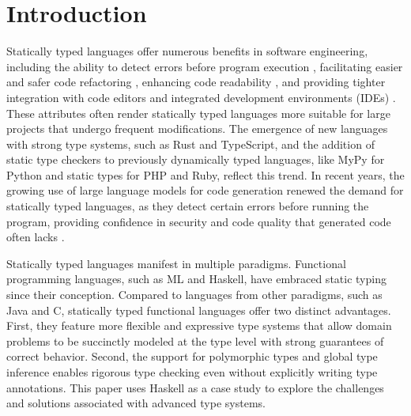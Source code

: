 \documentclass[pdflatex,lineno,sn-nature,Numbered]{sn-jnl}%
\begin{document}
\maketitle

\section{Introduction} \label{sec:introduction}

Statically typed languages offer numerous benefits in software engineering, including the ability to detect errors before program execution \cite{Ray2017-gq,Gao2017-xn}, facilitating easier and safer code refactoring \cite{Kleinschmager2012-bg}, enhancing code readability \cite{Endrikat2014-uz}, and providing tighter integration with code editors and integrated development environments (IDEs) \cite{Mayer2012-ko}. These attributes often render statically typed languages more suitable for large projects that undergo frequent modifications. The emergence of new languages with strong type systems, such as Rust and TypeScript, and the addition of static type checkers to previously dynamically typed languages, like MyPy for Python and static types for PHP and Ruby, reflect this trend. In recent years, the growing use of large language models for code generation renewed the demand for statically typed languages, as they detect certain errors before running the program, providing confidence in security and code quality that generated code often lacks \cite{Tambon2024-fw,Zhong2023-iv,Chong2024-kv,Ramirez2024-nv}.

Statically typed languages manifest in multiple paradigms. Functional programming languages, such as ML and Haskell, have embraced static typing since their conception. Compared to languages from other paradigms, such as Java and C, statically typed functional languages offer two distinct advantages. First, they feature more flexible and expressive type systems that allow domain problems to be succinctly modeled at the type level with strong guarantees of correct behavior. Second, the support for polymorphic types and global type inference enables rigorous type checking even without explicitly writing type annotations. This paper uses Haskell as a case study to explore the challenges and solutions associated with advanced type systems.
\end{document}
